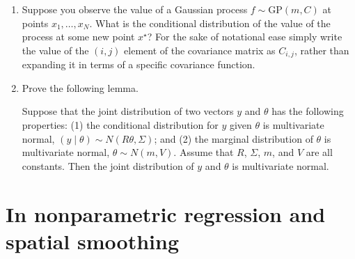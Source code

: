 \documentclass{homework}
\begin{document}
\begin{enumerate}[label=(\Alph*)]
\item Suppose you observe the value of a Gaussian process $f \sim \mbox{GP}(m,C)$ at points $x_1, \ldots, x_N$.  What is the conditional distribution of the value of the process at some new point $x^{\star}$?  For the sake of notational ease simply write the value of the $(i,j)$ element of the covariance matrix as $C_{i,j}$, rather than expanding it in terms of a specific covariance function.

\item Prove the following lemma.

Suppose that the joint distribution of two vectors $y$ and $\theta$ has the following properties: (1) the conditional distribution for $y$ given $\theta$ is multivariate normal, $(y \mid \theta) \sim N(R\theta, \Sigma)$; and (2) the marginal distribution of $\theta$ is multivariate normal, $\theta \sim N(m,V)$.  Assume that $R$, $\Sigma$, $m$, and $V$ are all constants.  Then the joint distribution of $y$ and $\theta$ is multivariate normal.

\end{enumerate}


\section{In nonparametric regression and spatial smoothing}
\end{document}
